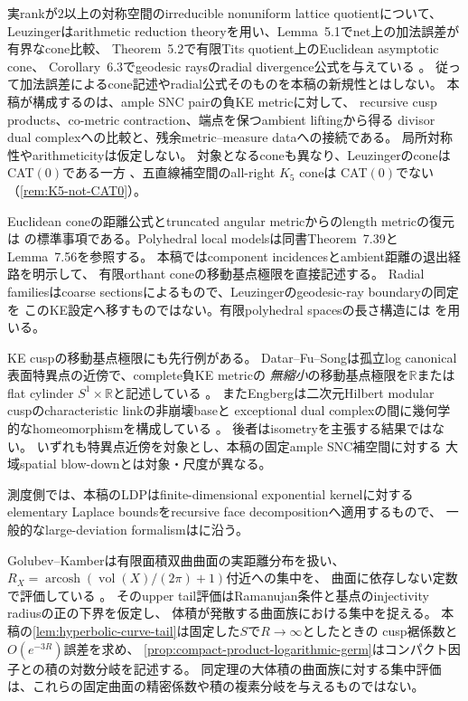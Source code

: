 \documentclass[11pt,a4paper]{ltjsarticle}
\newcommand{\RR}{\mathbb R}
\newcommand{\vol}{\operatorname{vol}}
\theoremstyle{plain}
\theoremstyle{definition}
\theoremstyle{remark}
\begin{document}
実rankが$2$以上の対称空間のirreducible nonuniform lattice quotientについて、
Leuzingerはarithmetic reduction theoryを用い、Lemma~5.1でnet上の加法誤差が有界なcone比較、
Theorem~5.2で有限Tits quotient上のEuclidean asymptotic cone、
Corollary~6.3でgeodesic raysのradial divergence公式を与えている
\cite[Lemma~5.1, Theorem~5.2, Corollary~6.3]{Leuzinger}。
従って加法誤差によるcone記述やradial公式そのものを本稿の新規性とはしない。
本稿が構成するのは、ample SNC pairの負KE metricに対して、
recursive cusp products、co-metric contraction、端点を保つambient liftingから得る
divisor dual complexへの比較と、残余metric--measure dataへの接続である。
局所対称性やarithmeticityは仮定しない。
対象となるconeも異なり、LeuzingerのconeはCAT$(0)$である一方
\cite[Corollary~5.5]{Leuzinger}、五直線補空間のall-right $K_5$ coneは
CAT$(0)$でない（\cref{rem:K5-not-CAT0}）。

Euclidean coneの距離公式とtruncated angular metricからのlength metricの復元は
\cite[Chapter~I, Definition~5.6 and Remarks~5.7, pp.~59--60]{BridsonHaefliger}
の標準事項である。Polyhedral local modelsは同書Theorem~7.39とLemma~7.56を参照する。
本稿ではcomponent incidencesとambient距離の退出経路を明示して、
有限orthant coneの移動基点極限を直接記述する。
Radial familiesはcoarse sectionsによるもので、Leuzingerのgeodesic-ray boundaryの同定を
このKE設定へ移すものではない。有限polyhedral spacesの長さ構造には
\cite{BridsonHaefliger,BBI}を用いる。

KE cuspの移動基点極限にも先行例がある。
Datar--Fu--Songは孤立log canonical表面特異点の近傍で、complete負KE metricの
\emph{無縮小}の移動基点極限を$\RR$またはflat cylinder $S^1\times\RR$と記述している
\cite[Corollary~1.1, arXiv version~2, pp.~3--4]{DatarFuSong}。
またEngbergは二次元Hilbert modular cuspのcharacteristic linkの非崩壊baseと
exceptional dual complexの間に幾何学的なhomeomorphismを構成している
\cite[Definition~1.2.12 and Proposition~1.2.13, pp.~25--27]{Engberg}。
後者はisometryを主張する結果ではない。
いずれも特異点近傍を対象とし、本稿の固定ample SNC補空間に対する
大域spatial blow-downとは対象・尺度が異なる。

測度側では、本稿のLDPはfinite-dimensional exponential kernelに対する
elementary Laplace boundsをrecursive face decompositionへ適用するもので、
一般的なlarge-deviation formalismは\cite{DemboZeitouni}に沿う。

Golubev--Kamberは有限面積双曲曲面の実距離分布を扱い、
$R_X=\operatorname{arcosh}(\vol(X)/(2\pi)+1)$付近への集中を、
曲面に依存しない定数で評価している
\cite[Theorem~1.1, arXiv version~1, pp.~1--2]{GolubevKamber}。
そのupper tail評価はRamanujan条件と基点のinjectivity radiusの正の下界を仮定し、
体積が発散する曲面族における集中を捉える。
本稿の\cref{lem:hyperbolic-curve-tail}は固定した$S$で$R\to\infty$としたときの
cusp裾係数と$O(e^{-3R})$誤差を求め、
\cref{prop:compact-product-logarithmic-germ}はコンパクト因子との積の対数分岐を記述する。
同定理の大体積の曲面族に対する集中評価は、これらの固定曲面の精密係数や積の複素分岐を与えるものではない。
\end{document}
